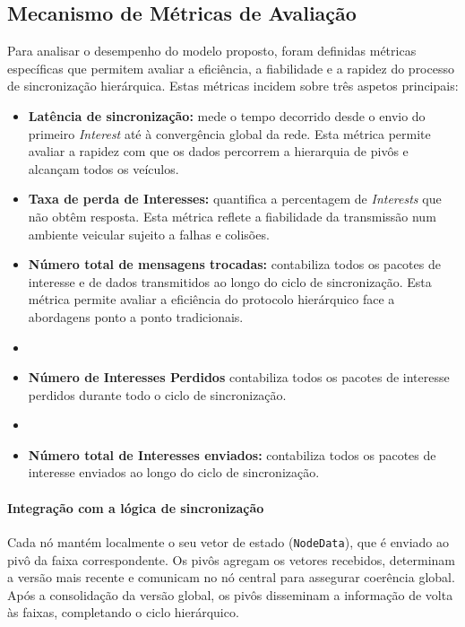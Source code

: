 \subsection{Mecanismo de Métricas de Avaliação}

Para analisar o desempenho do modelo proposto, foram definidas métricas específicas que permitem avaliar a eficiência, a fiabilidade e a rapidez do processo de sincronização hierárquica. Estas métricas incidem sobre três aspetos principais:

\begin{itemize}
    \item \textbf{Latência de sincronização:} mede o tempo decorrido desde o envio do primeiro \textit{Interest} até à convergência global da rede. Esta métrica permite avaliar a rapidez com que os dados percorrem a hierarquia de pivôs e alcançam todos os veículos.
    \item \textbf{Taxa de perda de Interesses:} quantifica a percentagem de \textit{Interests} que não obtêm resposta. Esta métrica reflete a fiabilidade da transmissão num ambiente veicular sujeito a falhas e colisões.
    \item \textbf{Número total de mensagens trocadas:} contabiliza todos os pacotes de interesse e de dados transmitidos ao longo do ciclo de sincronização. Esta métrica permite avaliar a eficiência do protocolo hierárquico face a abordagens ponto a ponto tradicionais.
    \item \item \textbf{Número de Interesses Perdidos} contabiliza todos os pacotes de interesse perdidos durante todo o ciclo de sincronização.
    \item \item \textbf{Número total de Interesses enviados:} contabiliza todos os pacotes de interesse enviados ao longo do ciclo de sincronização.
\end{itemize}

\paragraph{Integração com a lógica de sincronização}

Cada nó mantém localmente o seu vetor de estado (\texttt{NodeData}), que é enviado ao pivô da faixa correspondente. Os pivôs agregam os vetores recebidos, determinam a versão mais recente e comunicam no nó central para assegurar coerência global. Após a consolidação da versão global, os pivôs disseminam a informação de volta às faixas, completando o ciclo hierárquico.


